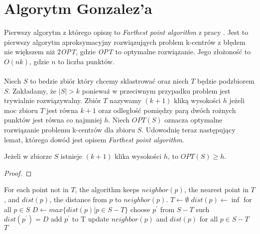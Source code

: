 \section{Algorytm Gonzalez'a}

Pierwszy algorytm z którego opiszę to \textit{Farthest point algorithm} z pracy \cite{Gonzalez1985ClusteringTM}.
Jest to pierwszy algorytm aproksymacyjny rozwiązująych problem k-centrów z błędem nie większem niż $2$\textit{OPT}, gdzie \textit{OPT} to optymalne rozwiązanie.
Jego złożoność to $O(nk)$, gdzie $n$ to liczba punktów. 
\\~\\
Niech $S$ to bedzie zbiór który chcemy sklastrować oraz niech $T$ będzie podzbiorem $S$.
Zakładamy, że $|S| > k$ ponieważ w przeciwnym przypadku problem jest trywialnie rozwiązywalny.
Zbiór $T$ nazywamy $(k+1)$ kliką wysokości $h$ jeżeli moc zbioru $T$ jest równa $k+1$ oraz odległość pomiędzy parą dwóch rożnych punktów jest równa co najmniej $h$. 
Niech $OPT(S)$ oznacza optymalne rozwiązanie problemu k-centrów dla zbioru $S$.
Udowodnię teraz następujący lemat, którego dowód jest opisem \textit{Farthest point algorithm}.

\begin{lemma}
    Jeżeli w zbiorze $S$ istnieje $(k+1)$ klika wysokości $h$, to $OPT(S) \geq h$.
\end{lemma}

\begin{proof}
    
\end{proof}

\begin{algorithm}
    \caption{}
\begin{algorithmic}
    \State For each point not in $T$, the algorithm keeps $neighbor(p)$, the nearest point in $T$, and $dist(p)$, the distance from $p$ to $neighbor(p)$.
        \State $T \leftarrow \emptyset$
        \State $dist(p) \leftarrow \inf$ for all $p \in S$
            \State $D \leftarrow max\{dist(p) | p \in S-T\}$
            \State choose $p^{'}$ from $S-T$ such $dist(p^{'}) = D$
            \State add $p^{'}$ to T
            \State update $neighbor(p)$ and $dist(p)$ for all $p \in S-T$
        \EndWhile
    \EndProcedure
    \Return $T$
\end{algorithmic}
\end{algorithm}